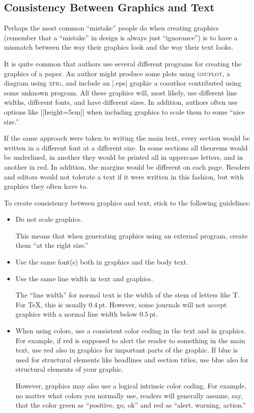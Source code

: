 \subsection{Consistency Between Graphics and Text}

Perhaps the most common ``mistake'' people do when creating graphics (remember
that a ``mistake'' in design is always just ``ignorance'') is to have a
mismatch between the way their graphics look and the way their text looks.

It is quite common that authors use several different programs for creating the
graphics of a paper. An author might produce some plots using \textsc{gnuplot},
a diagram using \textsc{xfig}, and include an |.eps| graphic a coauthor
contributed using some unknown program. All these graphics will, most likely,
use different line widths, different fonts, and have different sizes. In
addition, authors often use options like |[height=5cm]| when including graphics
to scale them to some ``nice size.''

If the same approach were taken to writing the main text, every section would
be written in a different font at a different size. In some sections all
theorems would be underlined, in another they would be printed all in uppercase
letters, and in another in red. In addition, the margins would be different on
each page. Readers and editors would not tolerate a text if it were written in
this fashion, but with graphics they often have to.

To create consistency between graphics and text, stick to the following
guidelines:
%
\begin{itemize}
    \item Do not scale graphics.

        This means that when generating graphics using an external program,
        create them ``at the right size.''
    \item Use the same font(s) both in graphics and the body text.
    \item Use the same line width in text and graphics.

        The  ``line width'' for normal text is the width of the stem of
        letters like T{}. For \TeX, this is usually
        $0.4\,\mathrm{pt}$. However, some journals will not accept graphics
        with a normal line width below $0.5\,\mathrm{pt}$.
    \item When using colors, use a consistent color coding in the text and in
        graphics. For example, if red is supposed to alert the reader to
        something in the main text, use red also in graphics for important
        parts of the graphic. If blue is used for structural elements like
        headlines and section titles, use blue also for structural elements
        of your graphic.

        However, graphics may also use a logical intrinsic color
        coding. For example, no matter what colors you normally use, readers
        will generally assume, say, that the color green as ``positive, go,
        ok'' and red as ``alert, warning, action.''
\end{itemize}

